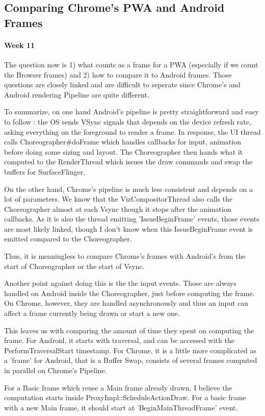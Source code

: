 \documentclass{kththesis}
\begin{document}
\subsection{Comparing Chrome's PWA and Android Frames}
\paragraph{Week 11}
The question now is 1) what counts as a frame for a PWA (especially if we count the Browser frames) and 2) how to compare it to Android frames.
Those questions are closely linked and are difficult to seperate since Chrome's and Android rendering Pipeline are quite different.

To summarize, on one hand Android's pipeline is pretty straightforward and easy to follow : the OS sends VSync signals that depends on the device refresh rate, asking everything on the foreground to render a frame. In response, the UI thread calls Choreographer\#doFrame which handles callbacks for input, animation before doing some sizing and layout. The Choreographer then hands what it computed to the RenderThread which issues the draw commands and swap the buffers for SurfaceFlinger.

On the other hand, Chrome's pipeline is much less consistent and depends on a lot of parameters. We know that the VizCompositorThread also calls the Choreographer almost at each Vsync though it stops after the animation callbacks. As it is also the thread emitting 'IssueBeginFrame' events, those events are most likely linked, though I don't know when this IssueBeginFrame event is emitted compared to the Choreographer.

Thus, it is meaningless to compare Chrome's frames with Android's from the start of Choreographer or the start of Vsync.

Another point against doing this is the the input events. Those are always handled on Android inside the Choreographer, just before computing the frame. On Chrome, however, they are handled asynchronously and thus an input can affect a frame currently being drawn or start a new one.

This leaves us with comparing the amount of time they spent on computing the frame. For Android, it starts with traversal, and can be accessed with the PerformTraversalStart timestamp. For Chrome, it is a little more complicated as a 'frame' for Android, that is a Buffer Swap, consists of several frames computed in parallel on Chrome's Pipeline.

For a Basic frame which reuse a Main frame already drawn, I believe the computation starts inside ProxyImpl::ScheduleActionDraw. For a basic frame with a new Main frame, it should start at 'BeginMainThreadFrame' event. 
\end{document}

